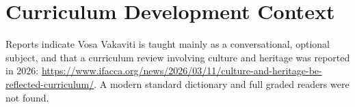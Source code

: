\documentclass[12pt]{article}
\begin{document}
\section{Curriculum Development Context}
Reports indicate Vosa Vakaviti is taught mainly as a conversational, optional subject, and that a curriculum review involving culture and heritage was reported in 2026: \url{https://www.ifacca.org/news/2026/03/11/culture-and-heritage-be-reflected-curriculum/}. A modern standard dictionary and full graded readers were not found.
\end{document}
